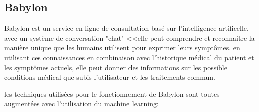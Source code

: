         \subsection*{Babylon}
            Babylon est un service en ligne de consultation basé sur l'intelligence artificelle, 
            avec un système de conversation "chat" <<elle peut comprendre et reconnaitre la manière 
            unique que les humains utilisent pour exprimer leurs symptômes. en utilisant ces 
            connaissances en combinaison avec l'historique médical du patient et les symptômes
            actuels, elle peut donner des informations sur les possible conditions médical 
            que subis l'utilisateur et les traitements commun.  \newline

            les techniques utilisées pour le fonctionnement de Babylon sont toutes 
            augmentées avec l'utilisation du machine learning: \newline
